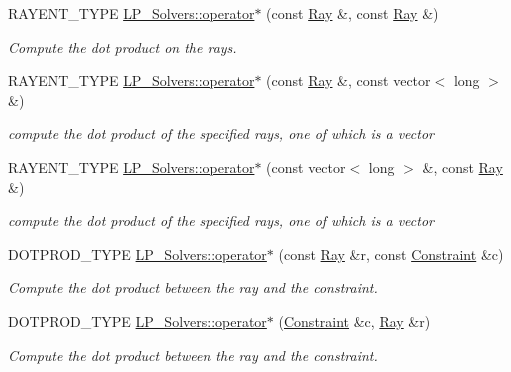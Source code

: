 \begin{DoxyCompactItemize}
R\+A\+Y\+E\+N\+T\+\_\+\+T\+Y\+PE \hyperlink{group___c_l_s_solvers_gaae1f5d07b6d0f4c12b4c7835977b64eb}{L\+P\+\_\+\+Solvers\+::operator$\ast$} (const \hyperlink{group___c_l_s_solvers_class_l_p___solvers_1_1_ray}{Ray} \&, const \hyperlink{group___c_l_s_solvers_class_l_p___solvers_1_1_ray}{Ray} \&)
\begin{DoxyCompactList}\small\item\em Compute the dot product on the rays. \end{DoxyCompactList}\item 
R\+A\+Y\+E\+N\+T\+\_\+\+T\+Y\+PE \hyperlink{group___c_l_s_solvers_ga9b4f6991b325c2a42e1f14fc09346277}{L\+P\+\_\+\+Solvers\+::operator$\ast$} (const \hyperlink{group___c_l_s_solvers_class_l_p___solvers_1_1_ray}{Ray} \&, const vector$<$ long $>$ \&)
\begin{DoxyCompactList}\small\item\em compute the dot product of the specified rays, one of which is a vector \end{DoxyCompactList}\item 
R\+A\+Y\+E\+N\+T\+\_\+\+T\+Y\+PE \hyperlink{group___c_l_s_solvers_gab64c33abcc54e5b175b7b567e099c75b}{L\+P\+\_\+\+Solvers\+::operator$\ast$} (const vector$<$ long $>$ \&, const \hyperlink{group___c_l_s_solvers_class_l_p___solvers_1_1_ray}{Ray} \&)
\begin{DoxyCompactList}\small\item\em compute the dot product of the specified rays, one of which is a vector \end{DoxyCompactList}\item 
D\+O\+T\+P\+R\+O\+D\+\_\+\+T\+Y\+PE \hyperlink{group___c_l_s_solvers_gaea75db1559315f35242d62e9e5f66e92}{L\+P\+\_\+\+Solvers\+::operator$\ast$} (const \hyperlink{group___c_l_s_solvers_class_l_p___solvers_1_1_ray}{Ray} \&r, const \hyperlink{group___c_l_s_solvers_class_l_p___solvers_1_1_constraint}{Constraint} \&c)
\begin{DoxyCompactList}\small\item\em Compute the dot product between the ray and the constraint. \end{DoxyCompactList}\item 
D\+O\+T\+P\+R\+O\+D\+\_\+\+T\+Y\+PE \hyperlink{group___c_l_s_solvers_gaf9f83e5d45bfc080fbffde26ebb93892}{L\+P\+\_\+\+Solvers\+::operator$\ast$} (\hyperlink{group___c_l_s_solvers_class_l_p___solvers_1_1_constraint}{Constraint} \&c, \hyperlink{group___c_l_s_solvers_class_l_p___solvers_1_1_ray}{Ray} \&r)
\begin{DoxyCompactList}\small\item\em Compute the dot product between the ray and the constraint. \end{DoxyCompactList}\item 

\end{DoxyCompactItemize}

